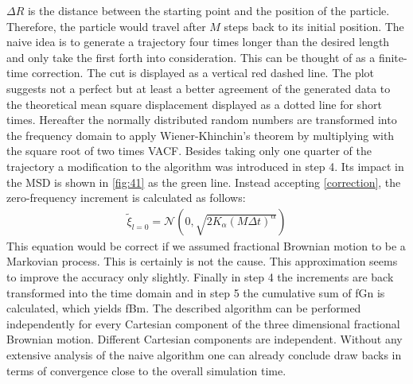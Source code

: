 \documentclass[
  a4paper,BCOR10mm,oneside,
  headsepline,footsepline,%
  fleqn,openbib
]{scrbook}
\begin{document}
$\Delta R $ is the distance between the starting point and the position of the particle. Therefore, the particle would travel after $M$ steps back to its initial position. The naive idea is to generate a trajectory four times longer than the desired length and only take the first forth into consideration. This can be thought of as a finite-time correction. The cut is displayed as a vertical red dashed line. The plot suggests not a perfect but at least a better agreement of the generated data to the theoretical mean square displacement displayed as a dotted line for short times. Hereafter the normally distributed random numbers are transformed into the frequency domain to apply Wiener-Khinchin's theorem by multiplying with the square root of two times VACF. Besides taking only one quarter of the trajectory a modification to the algorithm was introduced in step 4. Its impact in the MSD is shown in \cref{fig:41} as the green line. Instead accepting  \cref{correction}, the zero-frequency increment is calculated as follows:
\begin{align}
 \tilde{\xi}_{l=0} = \mathcal{N}(0,\sqrt{2 K_{\alpha} (M \Delta t)^\alpha})
\end{align}
This equation would be correct if we assumed fractional Brownian motion to be a Markovian process. This is certainly is not the cause. This approximation seems to improve the accuracy only slightly.
Finally in step 4 the increments are back transformed into the time domain and in step 5 the cumulative sum of fGn is calculated, which yields fBm. The described algorithm can be performed independently for every Cartesian component of the three dimensional fractional Brownian motion. Different Cartesian components are independent. Without any extensive analysis of the naive algorithm one can already conclude draw backs in terms of convergence close to the overall simulation time. 
\end{document}
